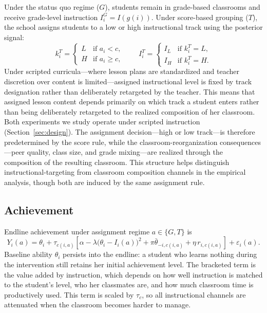\documentclass[11pt]{article}
\begin{document}
Under the status quo regime ($G$), students remain in grade-based classrooms and receive grade\mbox{-}level instruction $I_i^G = I(g(i))$. Under score-based grouping ($T$), the school assigns students to a low or high instructional track using the posterior signal:
\begin{equation}
k_i^T =
\begin{cases}
L & \text{if } a_i < c, \\
H & \text{if } a_i \geq c,
\end{cases}
\qquad
I_i^T =
\begin{cases}
I_L & \text{if } k_i^T = L, \\
I_H & \text{if } k_i^T = H.
\end{cases}
\end{equation}
Under scripted curricula---where lesson plans are standardized and teacher discretion over content is limited---assigned instructional level is fixed by track designation rather than deliberately retargeted by the teacher. This means that assigned lesson content depends primarily on which track a student enters rather than being deliberately retargeted to the realized composition of her classroom. Both experiments we study operate under scripted instruction (Section~\ref{sec:design}). The assignment decision---high or low track---is therefore predetermined by the score rule, while the classroom-reorganization consequences---peer quality, class size, and grade mixing---are realized through the composition of the resulting classroom. This structure helps distinguish instructional-targeting from classroom composition channels in the empirical analysis, though both are induced by the same assignment rule.

\subsection{Achievement}

Endline achievement under assignment regime $a \in \{G, T\}$ is
\begin{equation}
\label{eq:learning}
Y_i(a) = \theta_i + \tau_{c(i,a)} \left[\alpha - \lambda\big(\theta_i - I_i(a)\big)^2 + \pi\bar{\theta}_{-i,c(i,a)} + \eta\, r_{i,c(i,a)}\right] + \varepsilon_i(a).
\end{equation}
Baseline ability $\theta_i$ persists into the endline: a student who learns nothing during the intervention still retains her initial achievement level. The bracketed term is the value added by instruction, which depends on how well instruction is matched to the student's level, who her classmates are, and how much classroom time is productively used. This term is scaled by $\tau_c$, so all instructional channels are attenuated when the classroom becomes harder to manage.
\end{document}
